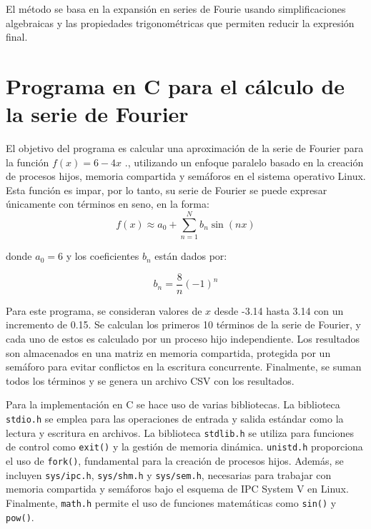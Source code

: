 {El método se basa en la expansión en series de Fourie usando simplificaciones algebraicas y las propiedades trigonométricas que permiten reducir la expresión final.



\section{Programa en C para el cálculo de la serie de Fourier}
    El objetivo del programa es calcular una aproximación de la serie de Fourier para la función \(f(x)=6−4x\) ., utilizando un enfoque paralelo basado en la creación de procesos hijos, memoria compartida y semáforos en el sistema operativo Linux. Esta función es impar, por lo tanto, su serie de Fourier se puede expresar únicamente con términos en seno, en la forma:
\[
f(x) \approx a_0 + \sum_{n=1}^{N} b_n \sin(nx)
\]

donde \( a_0 = 6 \) y los coeficientes \( b_n \) están dados por:

\[
b_n = \frac{8}{n}(-1)^n
\]

Para este programa, se consideran valores de \( x \) desde -3.14 hasta 3.14 con un incremento de 0.15. Se calculan los primeros 10 términos de la serie de Fourier, y cada uno de estos es calculado por un proceso hijo independiente. Los resultados son almacenados en una matriz en memoria compartida, protegida por un semáforo para evitar conflictos en la escritura concurrente. Finalmente, se suman todos los términos y se genera un archivo CSV con los resultados.


Para la implementación en C se hace uso de varias bibliotecas. La biblioteca \texttt{stdio.h} se emplea para las operaciones de entrada y salida estándar como la lectura y escritura en archivos. La biblioteca \texttt{stdlib.h} se utiliza para funciones de control como \texttt{exit()} y la gestión de memoria dinámica. \texttt{unistd.h} proporciona el uso de \texttt{fork()}, fundamental para la creación de procesos hijos. Además, se incluyen \texttt{sys/ipc.h}, \texttt{sys/shm.h} y \texttt{sys/sem.h}, necesarias para trabajar con memoria compartida y semáforos bajo el esquema de IPC System V en Linux. Finalmente, \texttt{math.h} permite el uso de funciones matemáticas como \texttt{sin()} y \texttt{pow()}.

}
